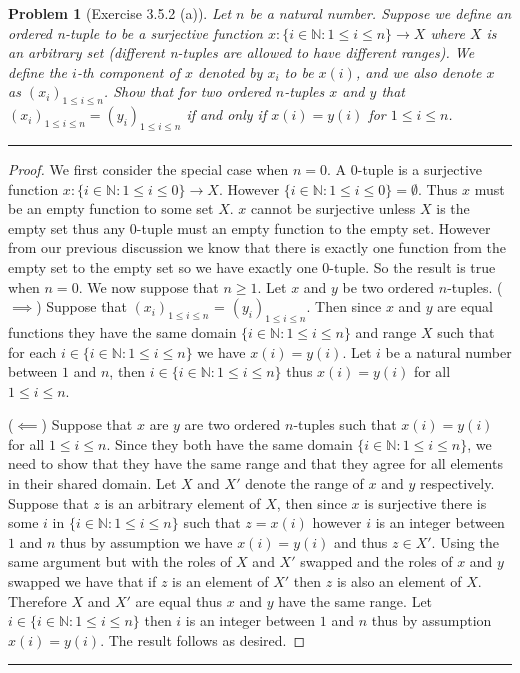 \documentclass{article}
\newcommand{\lined}{\noindent\rule{\textwidth}{1pt}}
\newtheorem*{problem}{Problem}
\begin{document}
	\begin{problem}[Exercise 3.5.2 (a)]
		Let $n$ be a natural number. Suppose we define an ordered n-tuple to be a surjective function $x:\{i \in \mathbb{N}:1 \leq i \leq n\} \rightarrow X$ where $X$ is an arbitrary set (different n-tuples are allowed to have different ranges). We define the $i$-th component of $x$ denoted by $x_i$ to be $x(i)$, and we also denote $x$ as $(x_i)_{1 \leq i \leq n}$. Show that for two ordered $n$-tuples $x$ and $y$ that $(x_i)_{1 \leq i \leq n} = (y_i)_{1 \leq i \leq n}$ if and only if $x(i) = y(i)$ for $1 \leq i \leq n$.
	\end{problem}
	
	\lined
	\begin{proof}
		We first consider the special case when $n = 0$. A $0$-tuple is a surjective function $x:\{i \in \mathbb{N}:1 \leq i \leq 0\} 
		\rightarrow X$. However $\{i \in \mathbb{N}:1 \leq i \leq 0\} = \emptyset$. Thus $x$ must be an empty function to some set $X$.
		$x$ cannot be surjective unless $X$ is the empty set thus any $0$-tuple must an empty function to the empty set. However from our previous discussion we know that there is exactly one function from the empty set to the empty set so we have exactly
		one $0$-tuple. So the result is true when $n = 0$. We now suppose that $n \geq 1$. Let $x$ and $y$ be two ordered $n$-tuples. ($\implies$) Suppose that $(x_i)_{1 \leq i \leq n}$ = $(y_i)_{1 \leq i \leq n}$. Then since $x$ and $y$ are equal functions they have the same domain $\{i \in \mathbb{N}:1\leq i \leq n\}$ and range $X$ such that for each $i \in \{i \in \mathbb{N}:1 \leq i \leq n\}$ we have $x(i) = y(i)$. Let $i$ be a natural number between $1$ and $n$, then $i \in \{i \in \mathbb{N}:1 \leq i \leq n\}$  thus $x(i) = y(i)$ for all $1 \leq i \leq n$.
		\linebreak
		
		\noindent ($\impliedby$) Suppose that $x$ are $y$ are two ordered $n$-tuples such that $x(i) = y(i)$ for all $1 \leq i \leq n$. Since they both have the same domain $\{i \in \mathbb{N}:1 \leq i \leq n\}$, we need to show that they have the same range and that they agree for all elements in their shared domain. Let $X$ and $X'$ denote the range of $x$ and $y$ respectively. Suppose that $z$ is an arbitrary element of $X$, then since $x$ is surjective there is some $i$ in $\{i \in \mathbb{N}:1 \leq i \leq n\}$
		such that $z = x(i)$ however $i$ is an integer between $1$ and $n$ thus by assumption we have $x(i) = y(i)$ and thus $z \in X'$.
		Using the same argument but with the roles of $X$ and $X'$ swapped and the roles of $x$ and $y$ swapped we have that if $z$ is an element of $X'$ then $z$ is also an element of $X$. Therefore $X$ and $X'$ are equal thus $x$ and $y$ have the same range. Let $i \in \{i \in \mathbb{N}:1 \leq i \leq n\}$ then $i$ is an integer between $1$ and $n$ thus by assumption $x(i) = y(i)$. The result follows as desired.
	\end{proof}
	\lined



	
\end{document}

